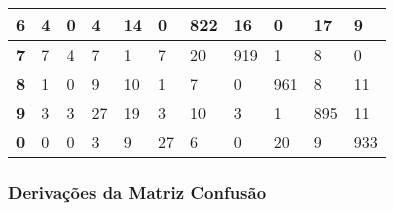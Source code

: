 \documentclass[a4paper]{article}
\begin{document}
\begin{table}[H]
\begin{tabular}{|l|l|l|l|l|l|l|l|l|l|l|}
        \textbf{6}                    & 4                         & 0                         & 4                          & 14                         & 0                          & 822                        & 16                          & 0                           & 17                          & 9                           \\ \hline
        \textbf{7}                    & \cellcolor[HTML]{FFFFFF}7 & \cellcolor[HTML]{FFFFFF}4 & \cellcolor[HTML]{FFFFFF}7  & \cellcolor[HTML]{FFFFFF}1  & \cellcolor[HTML]{FFFFFF}7  & \cellcolor[HTML]{FFFFFF}20 & \cellcolor[HTML]{FFFFFF}919 & \cellcolor[HTML]{FFFFFF}1   & \cellcolor[HTML]{FFFFFF}8   & \cellcolor[HTML]{FFFFFF}0   \\ \hline
        \textbf{8}                    & \cellcolor[HTML]{FFFFFF}1 & \cellcolor[HTML]{FFFFFF}0 & \cellcolor[HTML]{FFFFFF}9  & \cellcolor[HTML]{FFFFFF}10 & \cellcolor[HTML]{FFFFFF}1  & \cellcolor[HTML]{FFFFFF}7  & \cellcolor[HTML]{FFFFFF}0   & \cellcolor[HTML]{FFFFFF}961 & \cellcolor[HTML]{FFFFFF}8   & \cellcolor[HTML]{FFFFFF}11  \\ \hline
        \textbf{9}                    & \cellcolor[HTML]{FFFFFF}3 & \cellcolor[HTML]{FFFFFF}3 & \cellcolor[HTML]{FFFFFF}27 & \cellcolor[HTML]{FFFFFF}19 & \cellcolor[HTML]{FFFFFF}3  & \cellcolor[HTML]{FFFFFF}10 & \cellcolor[HTML]{FFFFFF}3   & \cellcolor[HTML]{FFFFFF}1   & \cellcolor[HTML]{FFFFFF}895 & \cellcolor[HTML]{FFFFFF}11  \\ \hline
        \textbf{0}                    & \cellcolor[HTML]{FFFFFF}0 & \cellcolor[HTML]{FFFFFF}0 & \cellcolor[HTML]{FFFFFF}3  & \cellcolor[HTML]{FFFFFF}9  & \cellcolor[HTML]{FFFFFF}27 & \cellcolor[HTML]{FFFFFF}6  & \cellcolor[HTML]{FFFFFF}0   & \cellcolor[HTML]{FFFFFF}20  & \cellcolor[HTML]{FFFFFF}9   & \cellcolor[HTML]{FFFFFF}933 \\ \hline
    \end{tabular}
\end{table}

\subsubsection{Derivações da Matriz Confusão}
\end{document}
